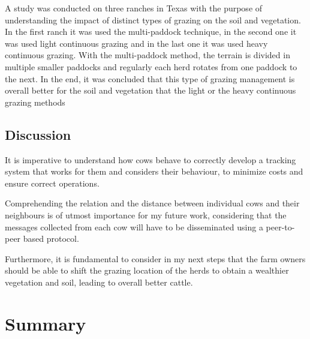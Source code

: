 A study was conducted on three ranches in Texas with the purpose of understanding the impact
of distinct types of grazing on the soil and vegetation. In the first ranch it was used the
multi-paddock technique, in the second one it was used light continuous grazing and in the
last one it was used heavy continuous grazing. With the multi-paddock method, the terrain is
divided in multiple smaller paddocks and regularly each herd rotates from one paddock to the
next. In the end, it was concluded that this type of grazing management is overall better for
the soil and vegetation that the light or the heavy continuous grazing methods \cite{Teague2011}

\subsection{Discussion}
\label{subsec:cow_discussion}
It is imperative to understand how cows behave to correctly develop a tracking system that
works for them and considers their behaviour, to minimize costs and ensure correct operations.

Comprehending the relation and the distance between individual cows and their neighbours is
of utmost importance for my future work, considering that the messages collected from each
cow will have to be disseminated using a peer-to-peer based protocol.

Furthermore, it is fundamental to consider in my next steps that the farm owners should be able
to shift the grazing location of the herds to obtain a wealthier vegetation and soil, leading
to overall better cattle.




\section{Summary}
\label{sec:summary}
